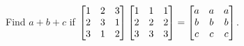 \begin{pro}
Find $a+b+c$ if $\begin{bmatrix}1 & 2 & 3 \cr 2 & 3 & 1 \cr 3 & 1 &
2 \cr \end{bmatrix}
\begin{bmatrix}1 & 1 & 1 \cr 2 & 2 & 2 \cr 3 & 3 & 3 \cr \end{bmatrix} =
\begin{bmatrix}a & a & a \cr b & b & b \cr c & c & c \cr \end{bmatrix}$.
\end{pro}





